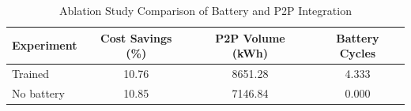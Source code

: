 \begin{table}[h]
\centering
\caption{Ablation Study Comparison of Battery and P2P Integration}
\label{table:ablation_results}
\begin{tabular}{lccc}
\hline
Experiment & Cost Savings (\%) & P2P Volume (kWh) & Battery Cycles \\
\hline
Trained & 10.76 & 8651.28 & 4.333 \\
No battery & 10.85 & 7146.84 & 0.000 \\
\hline
\end{tabular}
\end{table}
